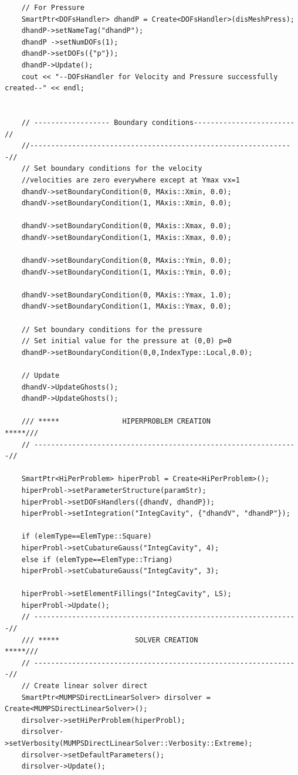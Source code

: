\documentclass[]{article}
\begin{document}
\begin{lstlisting}
	// For Pressure
	SmartPtr<DOFsHandler> dhandP = Create<DOFsHandler>(disMeshPress);
	dhandP->setNameTag("dhandP");
	dhandP ->setNumDOFs(1);
	dhandP->setDOFs({"p"});
	dhandP->Update(); 
	cout << "--DOFsHandler for Velocity and Pressure successfully created--" << endl;
	
	
	// ------------------ Boundary conditions------------------------ //
	//---------------------------------------------------------------//
	// Set boundary conditions for the velocity
	//velocities are zero everywhere except at Ymax vx=1
	dhandV->setBoundaryCondition(0, MAxis::Xmin, 0.0);
	dhandV->setBoundaryCondition(1, MAxis::Xmin, 0.0);
	
	dhandV->setBoundaryCondition(0, MAxis::Xmax, 0.0);
	dhandV->setBoundaryCondition(1, MAxis::Xmax, 0.0);
	
	dhandV->setBoundaryCondition(0, MAxis::Ymin, 0.0);
	dhandV->setBoundaryCondition(1, MAxis::Ymin, 0.0);
	
	dhandV->setBoundaryCondition(0, MAxis::Ymax, 1.0);
	dhandV->setBoundaryCondition(1, MAxis::Ymax, 0.0);
	
	// Set boundary conditions for the pressure
	// Set initial value for the pressure at (0,0) p=0  
	dhandP->setBoundaryCondition(0,0,IndexType::Local,0.0);
	
	// Update
	dhandV->UpdateGhosts();
	dhandP->UpdateGhosts();
	
	/// *****               HIPERPROBLEM CREATION               *****///
	// ---------------------------------------------------------------//
	
	SmartPtr<HiPerProblem> hiperProbl = Create<HiPerProblem>();
	hiperProbl->setParameterStructure(paramStr);
	hiperProbl->setDOFsHandlers({dhandV, dhandP});
	hiperProbl->setIntegration("IntegCavity", {"dhandV", "dhandP"});
	
	if (elemType==ElemType::Square)
	hiperProbl->setCubatureGauss("IntegCavity", 4);
	else if (elemType==ElemType::Triang)
	hiperProbl->setCubatureGauss("IntegCavity", 3);
	
	hiperProbl->setElementFillings("IntegCavity", LS);
	hiperProbl->Update();
	// ---------------------------------------------------------------//
	/// *****                  SOLVER CREATION                  *****///
	// ---------------------------------------------------------------//
	// Create linear solver direct
	SmartPtr<MUMPSDirectLinearSolver> dirsolver = Create<MUMPSDirectLinearSolver>();
	dirsolver->setHiPerProblem(hiperProbl);
	dirsolver->setVerbosity(MUMPSDirectLinearSolver::Verbosity::Extreme);
	dirsolver->setDefaultParameters();
	dirsolver->Update();
		

\end{lstlisting}
\end{document}
